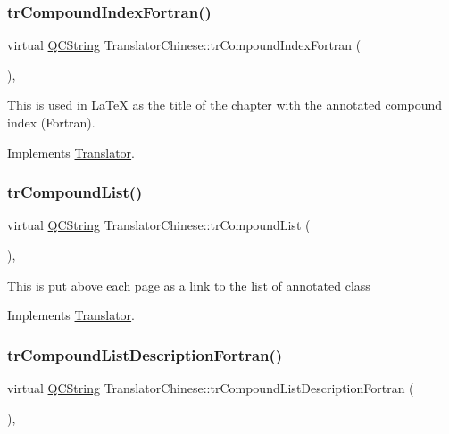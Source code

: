\subsubsection{\texorpdfstring{trCompoundIndexFortran()}{trCompoundIndexFortran()}}
{\footnotesize\ttfamily virtual \mbox{\hyperlink{class_q_c_string}{Q\+C\+String}} Translator\+Chinese\+::tr\+Compound\+Index\+Fortran (\begin{DoxyParamCaption}{ }\end{DoxyParamCaption})\hspace{0.3cm}{\ttfamily [inline]}, {\ttfamily [virtual]}}

This is used in La\+TeX as the title of the chapter with the annotated compound index (Fortran). 

Implements \mbox{\hyperlink{class_translator}{Translator}}.

\mbox{\label{class_translator_chinese_acf6ffd64cb26ecbe7cfc7bcbc91a932d}} 
\subsubsection{\texorpdfstring{trCompoundList()}{trCompoundList()}}
{\footnotesize\ttfamily virtual \mbox{\hyperlink{class_q_c_string}{Q\+C\+String}} Translator\+Chinese\+::tr\+Compound\+List (\begin{DoxyParamCaption}{ }\end{DoxyParamCaption})\hspace{0.3cm}{\ttfamily [inline]}, {\ttfamily [virtual]}}

This is put above each page as a link to the list of annotated class 

Implements \mbox{\hyperlink{class_translator}{Translator}}.

\mbox{\label{class_translator_chinese_aadbc404b206a2fa05a8bdeffbade0d83}} 
\subsubsection{\texorpdfstring{trCompoundListDescriptionFortran()}{trCompoundListDescriptionFortran()}}
{\footnotesize\ttfamily virtual \mbox{\hyperlink{class_q_c_string}{Q\+C\+String}} Translator\+Chinese\+::tr\+Compound\+List\+Description\+Fortran (\begin{DoxyParamCaption}{ }\end{DoxyParamCaption})\hspace{0.3cm}{\ttfamily [inline]}, {\ttfamily [virtual]}}


